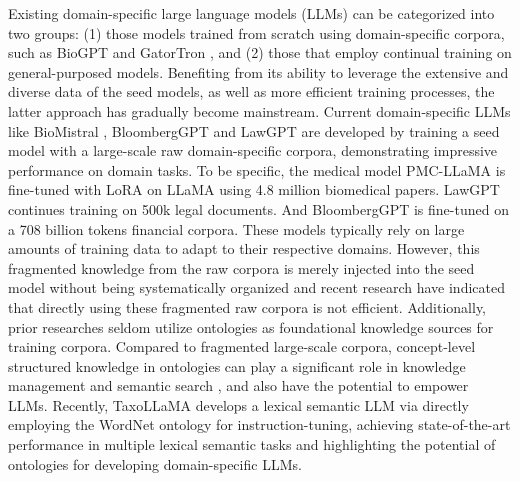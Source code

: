 Existing domain-specific large language models (LLMs) can be categorized into two groups: (1) those models trained from scratch using domain-specific corpora, such as BioGPT \cite{DBLP:journals/bib/LuoSXQZPL22} and GatorTron \cite{DBLP:journals/corr/abs-2203-03540}, and (2) those \cite{DBLP:conf/icde/00070HCGYBZYSWY23,DBLP:conf/acl/ZhangCFLL0C24,DBLP:conf/acl/LabrakBMGRD24, DBLP:journals/corr/abs-2303-17564} that employ continual training on general-purposed models. Benefiting from its ability to leverage the extensive and diverse data of the seed models, as well as more efficient training processes, the latter approach has gradually become mainstream. Current domain-specific LLMs like BioMistral \cite{DBLP:conf/acl/LabrakBMGRD24}, BloombergGPT \cite{DBLP:journals/corr/abs-2303-17564} and LawGPT \cite{DBLP:journals/corr/abs-2406-04614} are developed by training a seed model with a large-scale raw domain-specific corpora, demonstrating impressive performance on domain tasks. To be specific, the medical model PMC-LLaMA \cite{DBLP:journals/corr/abs-2304-14454} is fine-tuned with LoRA \cite{DBLP:conf/iclr/HuSWALWWC22}  on LLaMA using 4.8 million biomedical papers. LawGPT \cite{DBLP:journals/corr/abs-2406-04614}  continues training on 500k legal documents. And BloombergGPT \cite{DBLP:journals/corr/abs-2303-17564} is fine-tuned on a 708 billion tokens financial corpora. These models typically rely on large amounts of training data to adapt to their respective domains. However, this fragmented knowledge from the raw corpora is merely injected into the seed model without being systematically organized and recent research \cite{DBLP:conf/iclr/ChengHW24,dorfner2024biomedical} have indicated that directly using these fragmented raw corpora is not efficient. Additionally, prior researches seldom utilize ontologies as foundational knowledge sources for training corpora. Compared to fragmented large-scale corpora, concept-level structured knowledge in ontologies can play a significant role in knowledge management \cite{DBLP:journals/corr/abs-2407-10671} and semantic search \cite{DBLP:conf/www/ZhangPWCZZBC19,DBLP:conf/acl/0002WHZS0WLFS023}, and also have the potential to empower LLMs. Recently, TaxoLLaMA \cite{DBLP:conf/acl/MoskvoretskiiNL24} develops a lexical semantic LLM via directly employing the WordNet \cite{DBLP:conf/naacl/Miller94a} ontology for instruction-tuning, achieving state-of-the-art performance in multiple lexical semantic tasks and highlighting the potential of ontologies for developing domain-specific LLMs.


